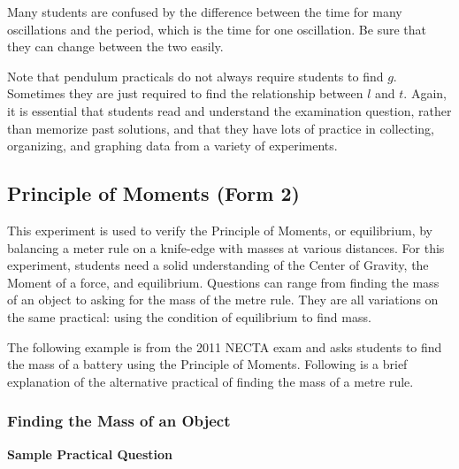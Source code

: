 Many students are confused by the difference between the time for many oscillations and
the period, which is the time for one oscillation. Be sure that they can change between
the two easily.

Note that pendulum practicals do not always require students to find $g$. Sometimes they are just required to find the relationship between $l$ and $t$. Again, it is essential that students read and understand the examination question, rather than memorize past solutions, and that they have lots of practice in collecting, organizing, and graphing data from a variety of experiments.

\subsection{Principle of Moments (Form 2)}

This experiment is used to verify the Principle of Moments, or equilibrium, by
balancing a meter rule on a knife-edge with masses at various distances. For this experiment, students need
a solid understanding of the Center of Gravity, the Moment of a force, and equilibrium.
Questions can range from finding the mass of an object to asking for
the mass of the metre rule. They are all
variations on the same practical: using the condition of equilibrium to find mass.

The following example is from the 2011 NECTA exam and asks students to find the mass of a battery using the Principle of Moments. Following is a brief explanation of the alternative practical of finding the mass of a metre rule.

\subsubsection{Finding the Mass of an Object}

\noindent \textbf{Sample Practical Question}\\

